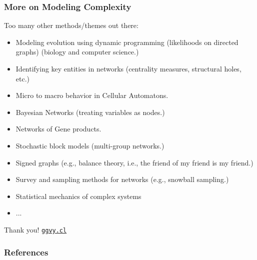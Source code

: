 \documentclass[aspectratio=169,10pt]{beamer}
\begin{document}
\begin{frame}
\frametitle{More on Modeling Complexity}
    
Too many other methods/themes out there:

\begin{itemize}
    \item Modeling evolution using dynamic programming (likelihoods on directed graphs) (biology and computer science.) \parencite{Felsenstein1981}
    \item Identifying key entities in networks (centrality measures, structural holes, etc.) \parencite{Bringmann2019}
    \item Micro to macro behavior in Cellular Automatons. \parencite{Wolfram1983}
    \item Bayesian Networks (treating variables as nodes.) \parencite{Heckerman2008}
    \item Networks of Gene products. \parencite{Hecker2009}
    \item Stochastic block models (multi-group networks.) \parencite{Holland1983}
    \item Signed graphs (e.g., balance theory, i.e., the friend of my friend is my friend.) \parencite{Cisneros2021}
    \item Survey and sampling methods for networks (e.g., snowball sampling.) \parencite{Goodman1961}
    \item Statistical mechanics of complex systems \parencite{Albert2002,barabasi2016network}
    \item ...
\end{itemize}

\end{frame}



\begin{frame}
	\centering
	\Huge Thank you! \normalsize 
\titlepage%
\vfill\hfill  \href{https://ggvy.cl}{\texttt{ggvy.cl}}
\end{frame}

\begin{frame}[allowframebreaks=1]
	\frametitle{References}
	\printbibliography
\end{frame}
\end{document}
